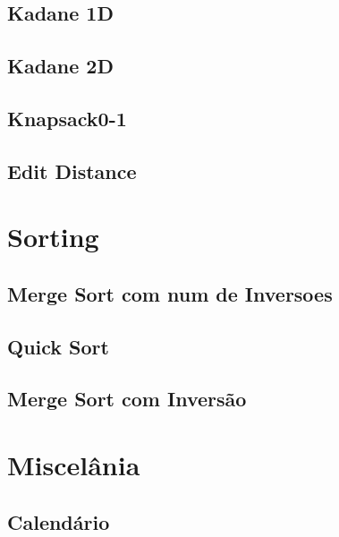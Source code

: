 \subsection{Kadane 1D}
\raggedbottom
\hrulefill
\subsection{Kadane 2D}
\raggedbottom
\hrulefill
\subsection{Knapsack0-1}
\raggedbottom
\hrulefill
\subsection{Edit Distance}
\raggedbottom
\hrulefill

\section{Sorting}
\subsection{Merge Sort com num de Inversoes}
\raggedbottom
\hrulefill
\subsection{Quick Sort}
\raggedbottom
\hrulefill
\subsection{Merge Sort com Inversão}
\raggedbottom
\hrulefill

\section{Miscelânia}
\subsection{Calendário}
\raggedbottom
\hrulefill

